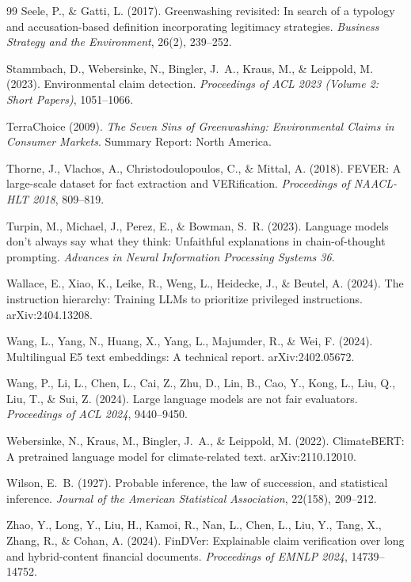 \begin{thebibliography}{99}
 Seele, P., \& Gatti, L. (2017). Greenwashing revisited: In search of a typology and accusation-based definition incorporating legitimacy strategies. \emph{Business Strategy and the Environment}, 26(2), 239–252.

 Stammbach, D., Webersinke, N., Bingler, J.~A., Kraus, M., \& Leippold, M. (2023). Environmental claim detection. \emph{Proceedings of ACL 2023 (Volume 2: Short Papers)}, 1051–1066.

 TerraChoice (2009). \emph{The Seven Sins of Greenwashing: Environmental Claims in Consumer Markets}. Summary Report: North America.

 Thorne, J., Vlachos, A., Christodoulopoulos, C., \& Mittal, A. (2018). FEVER: A large-scale dataset for fact extraction and VERification. \emph{Proceedings of NAACL-HLT 2018}, 809–819.

 Turpin, M., Michael, J., Perez, E., \& Bowman, S.~R. (2023). Language models don't always say what they think: Unfaithful explanations in chain-of-thought prompting. \emph{Advances in Neural Information Processing Systems 36}.

 Wallace, E., Xiao, K., Leike, R., Weng, L., Heidecke, J., \& Beutel, A. (2024). The instruction hierarchy: Training LLMs to prioritize privileged instructions. arXiv:2404.13208.

 Wang, L., Yang, N., Huang, X., Yang, L., Majumder, R., \& Wei, F. (2024). Multilingual E5 text embeddings: A technical report. arXiv:2402.05672.

 Wang, P., Li, L., Chen, L., Cai, Z., Zhu, D., Lin, B., Cao, Y., Kong, L., Liu, Q., Liu, T., \& Sui, Z. (2024). Large language models are not fair evaluators. \emph{Proceedings of ACL 2024}, 9440–9450.

 Webersinke, N., Kraus, M., Bingler, J.~A., \& Leippold, M. (2022). ClimateBERT: A pretrained language model for climate-related text. arXiv:2110.12010.

 Wilson, E.~B. (1927). Probable inference, the law of succession, and statistical inference. \emph{Journal of the American Statistical Association}, 22(158), 209–212.

 Zhao, Y., Long, Y., Liu, H., Kamoi, R., Nan, L., Chen, L., Liu, Y., Tang, X., Zhang, R., \& Cohan, A. (2024). FinDVer: Explainable claim verification over long and hybrid-content financial documents. \emph{Proceedings of EMNLP 2024}, 14739–14752.


\end{thebibliography}
